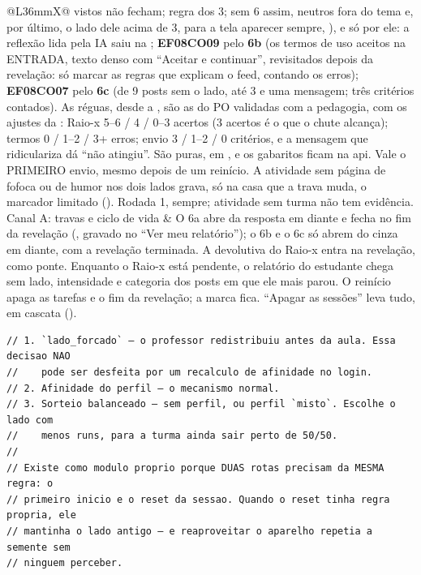 \begin{tabularx}{\linewidth}{@{}L{36mm}X@{}}
  vistos não fecham; regra dos 3; sem 6 assim, neutros fora do tema e, por
  último, o lado dele acima de 3, para a tela aparecer sempre,
  ), e só por ele: a reflexão lida pela IA
  saiu na ;
  \textbf{EF08CO09} pelo \textbf{6b} (os termos de uso aceitos na
  ENTRADA, texto denso com \enquote{Aceitar e continuar}, revisitados depois
  da revelação: só marcar as regras que explicam o feed, contando os erros);
  \textbf{EF08CO07} pelo \textbf{6c} (de 9 posts sem o lado, até 3 e uma
  mensagem; três critérios contados). As réguas, desde a , são
  as do PO validadas com a pedagogia, com os ajustes da :
  Raio-x 5--6 / 4 / 0--3 acertos (3 acertos é o que o chute alcança);
  termos 0 / 1--2 / 3+ erros; envio 3 / 1--2 / 0 critérios, e a mensagem
  que ridiculariza dá \enquote{não atingiu}. São puras, em
  , e os gabaritos ficam na api. Vale o PRIMEIRO envio,
  mesmo depois de um reinício. A atividade sem página de fofoca ou de humor
  nos dois lados grava, só na casa que a trava muda, o marcador limitado
   (). Rodada 1, sempre; atividade
  sem turma não tem evidência.\\
Canal A: travas e ciclo de vida & O 6a abre da resposta em diante e fecha no
  fim da revelação (, gravado no \enquote{Ver
  meu relatório}); o 6b e o 6c só abrem do cinza em diante, com a revelação
  terminada. A devolutiva do Raio-x entra na revelação, como ponte. Enquanto o
  Raio-x está pendente, o relatório do estudante chega sem lado, intensidade e
  categoria dos posts em que ele mais parou. O reinício apaga as tarefas e o
  fim da revelação; a marca fica. \enquote{Apagar as
  sessões} leva tudo, em cascata ().\\
\bottomrule
\end{tabularx}

\begin{lstlisting}[language=tsunoo, caption={Precedência da largada (\arq{src/perfis/largada.ts})}, label={lst:largada}]
// 1. `lado_forcado` — o professor redistribuiu antes da aula. Essa decisao NAO
//    pode ser desfeita por um recalculo de afinidade no login.
// 2. Afinidade do perfil — o mecanismo normal.
// 3. Sorteio balanceado — sem perfil, ou perfil `misto`. Escolhe o lado com
//    menos runs, para a turma ainda sair perto de 50/50.
//
// Existe como modulo proprio porque DUAS rotas precisam da MESMA regra: o
// primeiro inicio e o reset da sessao. Quando o reset tinha regra propria, ele
// mantinha o lado antigo — e reaproveitar o aparelho repetia a semente sem
// ninguem perceber.
\end{lstlisting}

